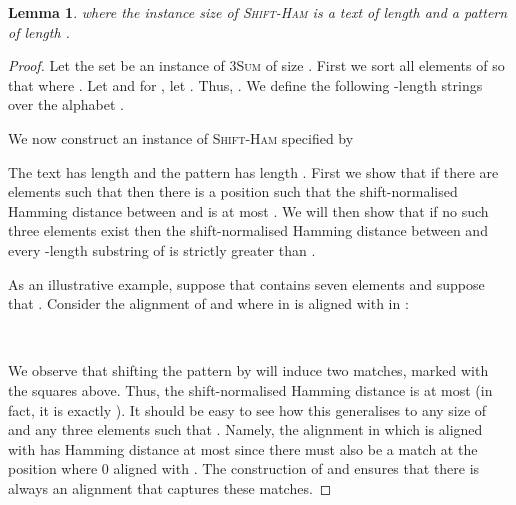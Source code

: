 \documentclass[11pt]{article}
\newcommand{\sHam}{\textsc{Shift-Ham}\xspace}
\newcommand{\threeSUM}{\textsc{3Sum}\xspace}
\newcommand{\cb}[1]{\makebox[4.05mm][c]{#1}}
\newcommand{\CB}[1]{\framebox[4.05mm][c]{#1}}
\newcommand{\cbS}[1]{\makebox[4.15mm][l]{#1}}
\newcommand{\cbx}[1]{\cb{}}
\newcommand{\cby}[1]{\cb{}}
\newcommand{\cbshrink}{\hspace{-0.5pt}}
\newcommand{\cbz}{\cb{0}}
\newcommand{\CBx}[1]{\CB{}}
\newcommand{\CBz}{\CB{0}}
\theoremstyle{plain}
\newtheorem{lemma}[theorem]{Lemma}
\theoremstyle{definition}
\begin{document}
\begin{lemma}
    \label{lem:sHamHard}
     where the instance size of \sHam is a text of length  and a pattern of length .
\end{lemma}
\begin{proof}
    Let the set  be an instance of \threeSUM of size . First we sort all elements of  so that  where . Let  and for , let . Thus, . We define the following -length strings over the alphabet .

We now construct an instance of \sHam specified by

The text  has length  and the pattern  has length . First we show that if there are elements  such that  then there is a position  such that the shift-normalised Hamming distance between  and  is at most . We will then show that if no such three elements exist then the shift-normalised Hamming distance between  and every -length substring of  is strictly greater than .

    As an illustrative example, suppose that  contains seven elements and suppose that . Consider the alignment of  and  where  in  is aligned with  in :
\begin{center}
        \footnotesize
        \cbS{T:}\cbz\cbz\cbz\cbz\cbz\cbz\cbz \cbx{1}\cbx{2}\cbx{3}\cbx{4}\cbx{5}\CBx{6}\cbx{7}\cby{1}\cby{2}\cby{3}\cby{4}\cby{5}\cby{6}\cby{7}\cbx{1}\cbx{2}\CBx{3}\cbx{4}\cbx{5}\cbx{6}\cbx{7}\cby{8}\cby{9}\cby{\cbshrink 1\!0}\cby{\cbshrink 1\!1}\cby{\cbshrink 1\!2}\cby{\cbshrink 1\!3}\cby{\cbshrink 1\!4}\\
        \cbS{P:}\cb{~}\cb{~}\cb{~}\cb{~}\cb{~}\cb{~}\cb{~}\cb{~}\cb{~}\cbx{7}\cbx{6}\cbx{5}\CBx{4}\cbx{3}\cbx{2}\cbx{1}\cbz\cbz\cbz\cbz\cbz\cbz\cbz \CBz\cbz\cbz\cbz\cbz\cbz\cbz \cb{~}\cb{~}\cb{~}\cb{~}\cb{~}
    \end{center}
We observe that shifting the pattern by  will induce two matches, marked with the squares above. Thus, the shift-normalised Hamming distance is at most  (in fact, it is exactly ). It should be easy to see how this generalises to any size of  and any three elements  such that . Namely, the alignment in which  is aligned with  has Hamming distance at most  since there must also be a match at the position where 0 aligned with . The construction of  and  ensures that there is always an alignment that captures these matches.


\end{proof}
\end{document}

